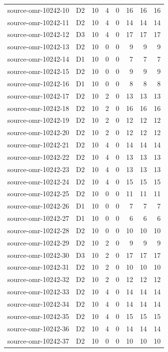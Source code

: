 \begin{longtable}{p{}lrrrrrr}
source-omr-10242-10 & D2 & 10 & 4 & 0 & 16 & 16 & 16\\
source-omr-10242-11 & D2 & 10 & 4 & 0 & 14 & 14 & 14\\
source-omr-10242-12 & D3 & 10 & 4 & 0 & 17 & 17 & 17\\
source-omr-10242-13 & D2 & 10 & 0 & 0 & 9 & 9 & 9\\
source-omr-10242-14 & D1 & 10 & 0 & 0 & 7 & 7 & 7\\
source-omr-10242-15 & D2 & 10 & 0 & 0 & 9 & 9 & 9\\
source-omr-10242-16 & D1 & 10 & 0 & 0 & 8 & 8 & 8\\
source-omr-10242-17 & D2 & 10 & 2 & 0 & 13 & 13 & 13\\
source-omr-10242-18 & D2 & 10 & 2 & 0 & 16 & 16 & 16\\
source-omr-10242-19 & D2 & 10 & 2 & 0 & 12 & 12 & 12\\
source-omr-10242-20 & D2 & 10 & 2 & 0 & 12 & 12 & 12\\
source-omr-10242-21 & D2 & 10 & 4 & 0 & 14 & 14 & 14\\
source-omr-10242-22 & D2 & 10 & 4 & 0 & 13 & 13 & 13\\
source-omr-10242-23 & D2 & 10 & 4 & 0 & 13 & 13 & 13\\
source-omr-10242-24 & D2 & 10 & 4 & 0 & 15 & 15 & 15\\
source-omr-10242-25 & D2 & 10 & 0 & 0 & 11 & 11 & 11\\
source-omr-10242-26 & D1 & 10 & 0 & 0 & 7 & 7 & 7\\
source-omr-10242-27 & D1 & 10 & 0 & 0 & 6 & 6 & 6\\
source-omr-10242-28 & D2 & 10 & 0 & 0 & 10 & 10 & 10\\
source-omr-10242-29 & D2 & 10 & 2 & 0 & 9 & 9 & 9\\
source-omr-10242-30 & D3 & 10 & 2 & 0 & 17 & 17 & 17\\
source-omr-10242-31 & D2 & 10 & 2 & 0 & 10 & 10 & 10\\
source-omr-10242-32 & D2 & 10 & 2 & 0 & 12 & 12 & 12\\
source-omr-10242-33 & D2 & 10 & 4 & 0 & 14 & 14 & 14\\
source-omr-10242-34 & D2 & 10 & 4 & 0 & 14 & 14 & 14\\
source-omr-10242-35 & D2 & 10 & 4 & 0 & 15 & 15 & 15\\
source-omr-10242-36 & D2 & 10 & 4 & 0 & 14 & 14 & 14\\
source-omr-10242-37 & D2 & 10 & 0 & 0 & 10 & 10 & 10\\

\end{longtable}
